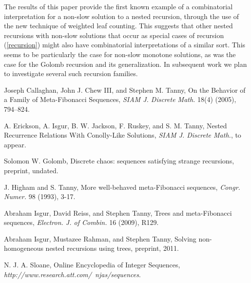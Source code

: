 \documentclass[12pt]{amsart}
\numberwithin{equation}{section}
\numberwithin{theorem}{section}
\numberwithin{table}{section}
\numberwithin{figure}{section}
\begin{document}
The results of this paper provide the first known example of a combinatorial interpretation for a non-slow solution to a nested recursion, through the use of the new technique of weighted leaf counting. This suggests that other nested recursions with non-slow solutions that occur as special cases of recursion (\ref{recursion}) might also have combinatorial interpretations of a similar sort. This seems to be particularly the case for non-slow monotone solutions, as was the case for the Golomb recursion and its generalization. In subsequent work we plan to investigate several such recursion families.

\begin{thebibliography}{99}

Joseph Callaghan, John J. Chew III, and Stephen M. Tanny,
On the Behavior of a Family of Meta-Fibonacci Sequences,
\emph{SIAM J. Discrete Math.} 18(4) (2005), 794--824.

 A. Erickson, A. Isgur, B. W. Jackson, F. Ruskey, and S. M. Tanny, Nested Recurrence Relations With Conolly-Like Solutions, \emph{SIAM J. Discrete Math.}, to appear.

Solomon W. Golomb,
  Discrete chaos: sequences satisfying strange recursions, preprint, undated.

J. Higham and S. Tanny, More well-behaved
    meta-Fibonacci sequences, \emph{Congr. Numer.} 98 (1993),
    3-17.

 Abraham Isgur, David Reiss, and Stephen Tanny, Trees and meta-Fibonacci sequences, \emph{Electron. J. of Combin.} 16 (2009), R129.

 Abraham Isgur, Mustazee Rahman, and Stephen Tanny, Solving non-homogeneous nested recursions using trees, preprint, 2011.

 N. J. A. Sloane, Online Encyclopedia of
    Integer Sequences, \emph{http://www.research.att.com/~njas/sequences}.

\iffalse
\bibitem{sna} N. J. A. Sloane, \emph{Online Encyclopedia of
    Integer Sequences}, \hfil\break
    \href{http://www.research.att.com/~njas/sequences}{\tt
    http://www.research.att.com/$\sim$njas/sequences}.
\fi

\end{thebibliography}
\end{document}
